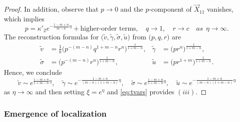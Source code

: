 \documentclass[a4paper,11pt]{article}
\def\tg{{\tilde{\gamma}}}
\def\tv{{\tilde{v}}}
\def\ts{{\tilde{\sigma}}}
\def\tu{{\tilde{u}}}
\begin{document}
\begin{proof}
In addition, observe that $p \rightarrow 0$ and the $p$-component of $\vec{X}_{11}$ vanishes, which implies
  $$p = \kappa'_2e^{- \frac{1-m+n}{m-n}\eta} + \text{higher-order terms}, \quad q\rightarrow 1, \quad r\rightarrow c\quad  as ~~\eta \rightarrow \infty.$$
  The reconstruction formulas for $\big(\tv,\tg,\ts,\tu\big)$ from $\big(p,q,r\big)$ are 
  \begin{equation}
  \begin{aligned}
  \tv &= \frac{1}{b}\Big( p^{-(m-n)}q^{1+m-n}r^n \Big)^{ \frac{1}{1+m-n}},&
  \tg &= \Big( pr^n \Big)^{ \frac{1}{1+m-n}},\\
  \ts &= \Big( p^{-(m-n)}r^n \Big)^{ \frac{1}{1+m-n}},&
  \tu &= \Big( pr^{1+m} \Big)^{ \frac{1}{1+m-n}}.
  \end{aligned}\label{eq:recon}
  \end{equation}
Hence, we conclude
  \begin{equation*}
   \tv \sim e^{ \frac{1-m+n}{1+m-n}\eta}, \quad \tg \sim e^{-\frac{1-m+n}{(m-n)(1+m-n)}\eta}, \quad   \ts \sim e^{\frac{1-m+n}{1+m-n}\eta}, \quad \tu \sim e^{-\frac{1-m+n}{(m-n)(1+m-n)}\eta} 
  \end{equation*}
  as $\eta \rightarrow \infty$ and then setting  $\xi = e^\eta$ and \eqref{eq:tvars} provides $(iii)$.  
\end{proof}

\subsubsection{Emergence of localization}
\end{document}
